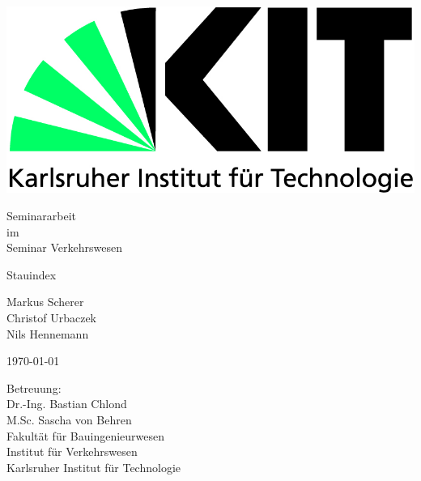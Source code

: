 \begin{titlepage}

    \includegraphics[scale=0.45]{images/0_kit-logo.jpg} 
    \vspace*{2cm} 

    \begin{center} \large 
    
        Seminararbeit \\
        im \\
        Seminar Verkehrswesen
    
        \vspace*{2cm}

        {\huge Stauindex}
        \vspace*{2.5cm}

        Markus Scherer\\
        Christof Urbaczek\\
        Nils Hennemann
    
        \vspace*{1.0cm}

        \today
        \vspace*{2.5cm}

        Betreuung:\\
        Dr.-Ing. Bastian Chlond\\
        M.Sc. Sascha von Behren \\[1cm]

        Fakultät für Bauingenieurwesen \\[0.5cm]

        Institut für Verkehrswesen \\[1cm]

        Karlsruher Institut für Technologie

    \end{center}
  \end{titlepage}

